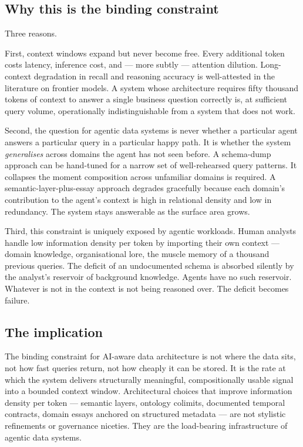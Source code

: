 \documentclass[11pt,a4paper]{article}
\begin{document}
\subsection{Why this is the binding constraint}

Three reasons.

First, context windows expand but never become free. Every additional token costs latency, inference cost, and --- more subtly --- attention dilution. Long-context degradation in recall and reasoning accuracy is well-attested in the literature on frontier models. A system whose architecture requires fifty thousand tokens of context to answer a single business question correctly is, at sufficient query volume, operationally indistinguishable from a system that does not work.

Second, the question for agentic data systems is never whether a particular agent answers a particular query in a particular happy path. It is whether the system \emph{generalises} across domains the agent has not seen before. A schema-dump approach can be hand-tuned for a narrow set of well-rehearsed query patterns. It collapses the moment composition across unfamiliar domains is required. A semantic-layer-plus-essay approach degrades gracefully because each domain's contribution to the agent's context is high in relational density and low in redundancy. The system stays answerable as the surface area grows.

Third, this constraint is uniquely exposed by agentic workloads. Human analysts handle low information density per token by importing their own context --- domain knowledge, organisational lore, the muscle memory of a thousand previous queries. The deficit of an undocumented schema is absorbed silently by the analyst's reservoir of background knowledge. Agents have no such reservoir. Whatever is not in the context is not being reasoned over. The deficit becomes failure.

\subsection{The implication}

The binding constraint for AI-aware data architecture is not where the data sits, not how fast queries return, not how cheaply it can be stored. It is the rate at which the system delivers structurally meaningful, compositionally usable signal into a bounded context window. Architectural choices that improve information density per token --- semantic layers, ontology colimits, documented temporal contracts, domain essays anchored on structured metadata --- are not stylistic refinements or governance niceties. They are the load-bearing infrastructure of agentic data systems.
\end{document}
